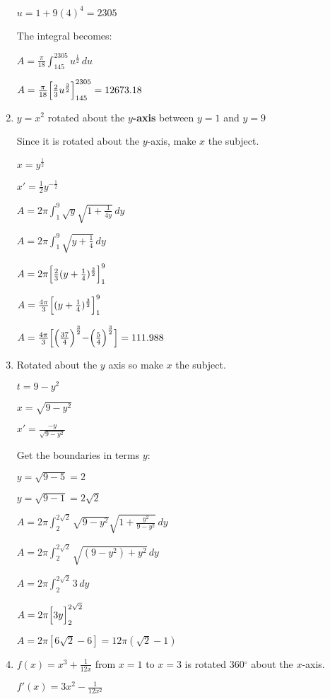 \documentclass[../main.tex]{subfiles}
\begin{document}
\begin{enumerate}[itemsep=0.7cm]
    $u=1+9(4)^4=2305$

    The integral becomes:

    $A=\frac{\pi}{18} \int_{145}^{2305} u^{\frac{1}{2}}\,du$
    
    $A=\frac{\pi}{18}\Bigl[\frac{2}{3}u^{\frac{3}{2}}\Bigr]_{145}^{2305}=12673.18$

    \item 
    $y=x^2$ rotated about the \textbf{$y$-axis} between $y=1$ and $y=9$

    Since it is rotated about the $y$-axis, make $x$ the subject.

    $x=y^{\frac{1}{2}}$

    $x'=\frac{1}{2}y^{-\frac{1}{2}}$

    $A=2\pi \int_1^9 \sqrt{y}\sqrt{1+\frac{1}{4y}}\,dy$

    $A=2\pi \int_1^9 \sqrt{y+\frac{1}{4}}\,dy$

    $A=2\pi \Bigl[\frac{2}{3}(y+\frac{1}{4})^{\frac{3}{2}}\Bigr]_1^9$

    $A=\frac{4\pi}{3} \Bigl[(y+\frac{1}{4})^{\frac{3}{2}}\Bigr]_1^9$

    $A=\frac{4\pi}{3}\Bigl[\Bigl(\frac{37}{4}\Bigr)^{\frac{3}{2}}-\Bigr(\frac{5}{4}\Bigl)^{\frac{3}{2}}\Bigr]=111.988$

    \item 
    Rotated about the $y$ axis so make $x$ the subject.

    $t=9-y^2$

    $x=\sqrt{9-y^2}$

    $x'=\frac{-y}{\sqrt{9-y^2}}$

    Get the boundaries in terms $y$:

    $y=\sqrt{9-5}=2$

    $y=\sqrt{9-1}=2\sqrt{2}$

    $A=2\pi \int_2^{2\sqrt{2}} \sqrt{9-y^2}\sqrt{1+\frac{y^2}{9-y^2}}\,dy$

    $A=2\pi \int_2^{2\sqrt{2}} \sqrt{(9-y^2)+y^2}\,dy$

    $A=2\pi \int_2^{2\sqrt{2}} 3\,dy$

    $A=2\pi \Bigl[3y\Bigr]_2^{2\sqrt{2}}$
    
    $A=2\pi [6\sqrt{2}-6]=12\pi(\sqrt{2}-1)$


    \item 
    $f(x)=x^3+\frac{1}{12x}$ from $x=1$ to $x=3$ is rotated 360$^\circ$ about the $x$-axis.

    $f'(x)=3x^2-\frac{1}{12x^2}$


\end{enumerate}
\end{document}
